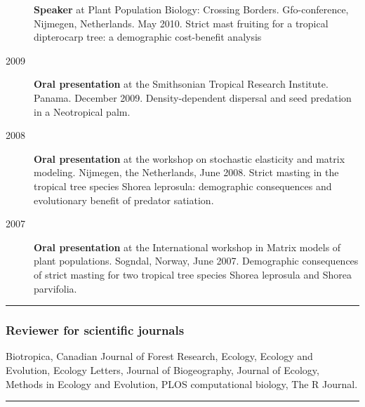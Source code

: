 \begin{description}
\textbf{Speaker} at Plant Population Biology: Crossing Borders.
Gfo-conference, Nijmegen, Netherlands. May 2010. Strict mast fruiting
for a tropical dipterocarp tree: a demographic cost-benefit analysis
\item[2009]
\textbf{Oral presentation} at the Smithsonian Tropical Research
Institute. Panama. December 2009. Density-dependent dispersal and seed
predation in a Neotropical palm.
\item[2008]
\textbf{Oral presentation} at the workshop on stochastic elasticity and
matrix modeling. Nijmegen, the Netherlands, June 2008. Strict masting in
the tropical tree species Shorea leprosula: demographic consequences and
evolutionary benefit of predator satiation.
\item[2007]
\textbf{Oral presentation} at the International workshop in Matrix
models of plant populations. Sogndal, Norway, June 2007. Demographic
consequences of strict masting for two tropical tree species Shorea
leprosula and Shorea parvifolia.
\end{description}

\begin{center}\rule{0.5\linewidth}{\linethickness}\end{center}

\subsubsection{Reviewer for scientific
journals}\label{reviewer-for-scientific-journals}

Biotropica, Canadian Journal of Forest Research, Ecology, Ecology and
Evolution, Ecology Letters, Journal of Biogeography, Journal of Ecology,
Methods in Ecology and Evolution, PLOS computational biology, The R
Journal.

\begin{center}\rule{0.5\linewidth}{\linethickness}\end{center}
